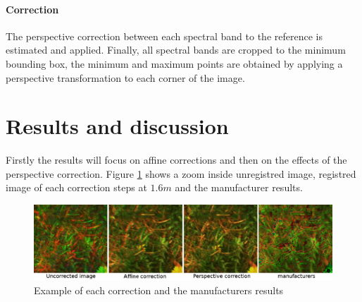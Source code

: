 \documentclass[]{elsarticle}
\begin{document}
	\paragraph{Correction}
	
	The perspective correction between each spectral band to the reference is estimated and applied.
	Finally, all spectral bands are cropped to the minimum bounding box,
	the minimum and maximum points are obtained by applying a perspective transformation to each corner of the image.
	
	
	\section{Results and discussion}
	
	Firstly the results will focus on affine corrections and then on the effects of the perspective correction.
	Figure \ref{fig:merged-correction} shows a zoom inside unregistred image, registred image of each correction steps at $1.6m$ and the manufacturer results.
	
	\begin{figure}[H]
		\centering
		\includegraphics[width=0.7\linewidth]{../figures/merged-correction.png}
		\caption{Example of each correction and the manufacturers results}
		\label{fig:merged-correction}
	\end{figure}
	
\end{document}
